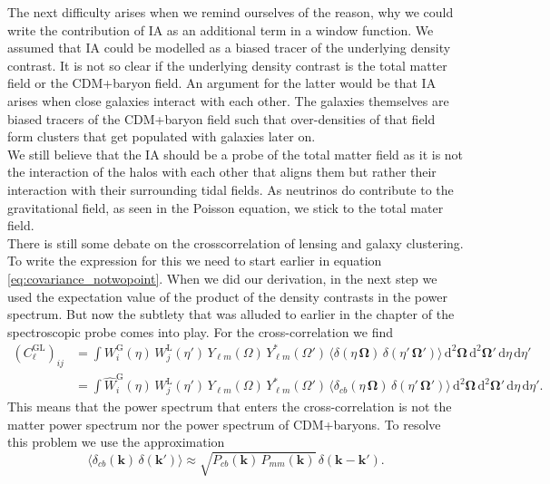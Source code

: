 \documentclass[oneside]{book}
\newcommand*{\rd}{\mathrm{d}}
\begin{document}
 The next difficulty arises when we remind ourselves of the reason, why we could write the contribution of IA as an additional term in a window function. We assumed that IA could be modelled as a biased tracer of the underlying density contrast. It is not so clear if the underlying density contrast is the total matter field or the CDM+baryon field. An argument for the latter would be that IA arises when close galaxies interact with each other. The galaxies themselves are biased tracers of the CDM+baryon field such that over-densities of that field form clusters that get populated with galaxies later on.\\
 We still believe that the IA should be a probe of the total matter field as it is not the interaction of the halos with each other that aligns them but rather their interaction with their surrounding tidal fields. As neutrinos do contribute to the gravitational field, as seen in the Poisson equation, we stick to the total mater field.\\
There is still some debate on the crosscorrelation of lensing and galaxy clustering. To write the expression for this we need to start earlier in equation \ref{eq:covariance_notwopoint}. When we did our derivation, in the next step we used the expectation value of the product of the density contrasts in the power spectrum. But now the subtlety that was alluded to earlier in the chapter of the spectroscopic probe comes into play. For the cross-correlation we find 
\begin{align}
    \left(C^\mathrm{GL}_{\ell}\right)_{ij}&= \int W_i^\mathrm{G}(\eta)\, W_j^\mathrm{L}(\eta')\, Y_{\ell m}(\Omega) \, Y^*_{\ell m}(\Omega')\, \langle \delta(\eta\,\boldsymbol{\Omega})\,\delta(\eta'\,\boldsymbol{\Omega}') \rangle\, \rd^2 \boldsymbol{\Omega} \, \rd^2 \boldsymbol{\Omega}' \,\rd \eta\, \rd \eta' \nonumber \\
    &= \int \hat{W}_i^\mathrm{G}(\eta)\, W_j^\mathrm{L}(\eta')\, Y_{\ell m}(\Omega) \, Y^*_{\ell m}(\Omega')\, \langle \delta_{cb}(\eta\,\boldsymbol{\Omega})\,\delta(\eta'\,\boldsymbol{\Omega}') \rangle\, \rd^2 \boldsymbol{\Omega} \, \rd^2 \boldsymbol{\Omega}' \,\rd \eta\, \rd \eta'.
\end{align} 
This means that the power spectrum that enters the cross-correlation is not the matter power spectrum nor the power spectrum of CDM+baryons. To resolve this problem we use the approximation \begin{equation}
    \langle \delta_{cb}(\boldsymbol{k})\,\delta(\boldsymbol{k}') \rangle \approx \sqrt{P_{cb}(\boldsymbol{k})\,P_{mm}(\boldsymbol{k})}\,\delta(\boldsymbol{k}-\boldsymbol{k}').
\end{equation}
\end{document}
